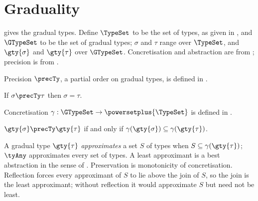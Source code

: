 \section{Graduality}
\label{sec:graduality}

 gives the gradual types. Define $\TypeSet$ to be the set of
types, as given in \specification, and $\GTypeSet$ to be the set
of gradual types; $\sigma$ and $\tau$ range over $\TypeSet$, and $\gty{\sigma}$ and $\gty{\tau}$ over
$\GTypeSet$. Concretisation and abstraction are from \citet{garcia2016}; precision is from
\citet{siek2015}.



\begin{definition}[Precision]
\label{def:precision}
Precision $\precTy$, a partial order on gradual types, is defined in .
\end{definition}

\begin{lemma}
\label{lem:static-discrete}
If $\sigma \precTy \tau$ then $\sigma = \tau$.
\end{lemma}

\begin{definition}[Concretisation]
\label{def:concretisation}
Concretisation $\gamma : \GTypeSet \to \powersetplus{\TypeSet}$ is defined in .
\end{definition}



\begin{lemma}
\label{lem:precision-concretisation}
$\gty{\sigma} \precTy \gty{\tau}$ if and only if $\gamma(\gty{\sigma}) \subseteq \gamma(\gty{\tau})$.
\end{lemma}

A gradual type $\gty{\tau}$ \emph{approximates} a set $S$ of types when $S \subseteq \gamma(\gty{\tau})$;
$\tyAny$ approximates every set of types. A least approximant is a best abstraction in the sense
of \citet{cousot1977}. Preservation is monotonicity of concretisation. Reflection forces every
approximant of $S$ to lie above the join of $S$, so the join is the least approximant; without
reflection it would approximate $S$ but need not be least.

